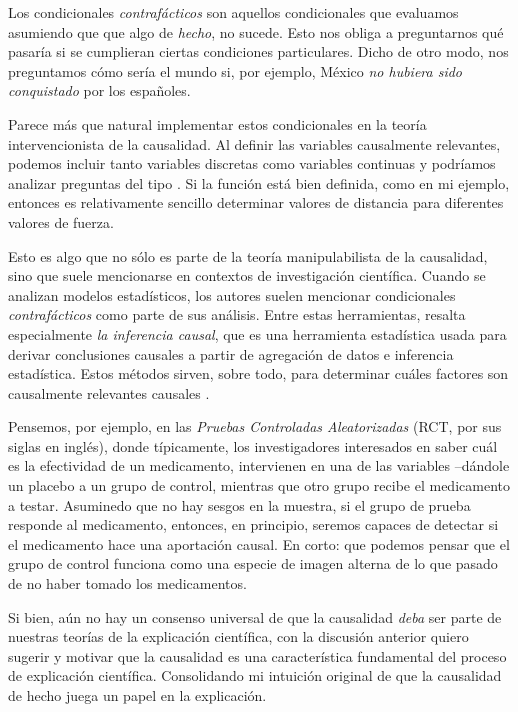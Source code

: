 Los condicionales \emph{contrafácticos} son aquellos condicionales
que evaluamos asumiendo que que algo de \emph{hecho}, no sucede. Esto
nos obliga a preguntarnos qué pasaría si se cumplieran ciertas
condiciones particulares. Dicho de otro modo, nos preguntamos cómo
sería el mundo si, por ejemplo, México \emph{no hubiera sido
 conquistado} por los españoles.

Parece más que natural implementar estos condicionales en la teoría
intervencionista de la causalidad. Al definir las variables
causalmente relevantes, podemos incluir tanto variables discretas
como variables continuas y podríamos analizar preguntas del tipo
. Si la función está bien definida, como en
mi ejemplo, entonces es relativamente sencillo determinar valores de
distancia para diferentes valores de fuerza.

Esto es algo que no sólo es parte de la teoría manipulabilista de la
causalidad, sino que suele mencionarse en contextos de investigación
científica. Cuando se analizan modelos estadísticos, los autores
suelen mencionar condicionales \emph{contrafácticos} como parte de
sus análisis. Entre estas herramientas, resalta especialmente
\emph{la inferencia causal}, que es una herramienta estadística usada
para derivar conclusiones causales a partir de agregación de datos e
inferencia estadística. Estos métodos sirven, sobre todo, para
determinar cuáles factores son causalmente relevantes causales
\parencite{Pearl2016, Pearl2018}.

Pensemos, por ejemplo, en las \emph{Pruebas Controladas
 Aleatorizadas} (RCT, por sus siglas en inglés), donde típicamente,
los investigadores interesados en saber cuál es la efectividad de un
medicamento, intervienen en una de las variables --dándole un placebo
a un grupo de control, mientras que otro grupo recibe el medicamento
a testar. Asuminedo que no hay sesgos en la muestra, si el grupo de
prueba responde al medicamento, entonces, en principio, seremos
capaces de detectar si el medicamento hace una aportación causal. En
corto: que podemos pensar que el grupo de control funciona como una
especie de imagen alterna de lo que  pasado de no haber
tomado los medicamentos.

Si bien, aún no hay un consenso universal de que la causalidad
\emph{deba} ser parte de nuestras teorías de la explicación
científica, con la discusión anterior quiero sugerir y motivar que la
causalidad es una característica fundamental del proceso de
explicación científica. Consolidando mi intuición original de que la
causalidad de hecho juega un papel en la explicación.

